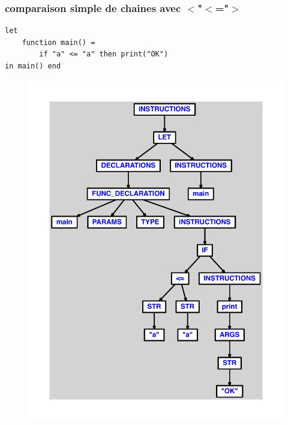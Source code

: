 \documentclass{article}
\begin{document}
\subsubsection{comparaison simple de chaines avec $ < $"$ < $="$ > $}
\begin{lstlisting}
let
	function main() =
		if "a" <= "a" then print("OK")
in main() end
\end{lstlisting}
\newpage
\begin{figure}[H]
\centering
\includegraphics[max width=\textwidth]{ast/ast_177.pdf}
\end{figure}
\newpage
\end{document}
